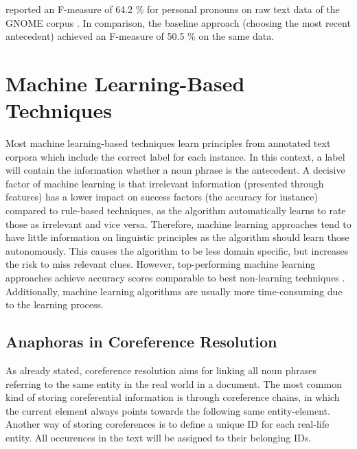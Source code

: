 \citep{poesio2004mate} reported an F-measure of 64.2 \% for personal pronouns on raw text data of the GNOME corpus \citep{poesio2004general}. In comparison, the baseline approach (choosing the most recent antecedent) achieved an F-measure of 50.5 \% on the same data.

\section{Machine Learning-Based Techniques}

Most machine learning-based techniques learn principles from annotated text corpora \citep{soon2001machine, bergsma2005automatic} which include the correct label for each instance. In this context, a label will contain the information whether a noun phrase is the antecedent. A decisive factor of machine learning is that irrelevant information (presented through features) has a lower impact on success factors (the accuracy for instance) compared to rule-based techniques, as the algorithm automatically learns to rate those as irrelevant and vice versa. Therefore, machine learning approaches tend to have little information on linguistic principles as the algorithm should learn those autonomously. This causes the algorithm to be less domain specific, but increases the risk to miss relevant clues. However, top-performing machine learning approaches achieve accuracy scores comparable to best non-learning techniques \citep{soon2001machine}. \\
Additionally, machine learning algorithms are usually more time-consuming due to the learning process.

\subsection{Anaphoras in Coreference Resolution}
\label{soon2001traininginstances} %

As already stated, coreference resolution aims for linking all noun phrases referring to the same entity in the real world in a document. The most common kind of storing coreferential information is through coreference chains, in which the current element always points towards the following same entity-element. Another way of storing coreferences is to define a unique ID for each real-life entity. All occurences in the text will be assigned to their belonging IDs.

